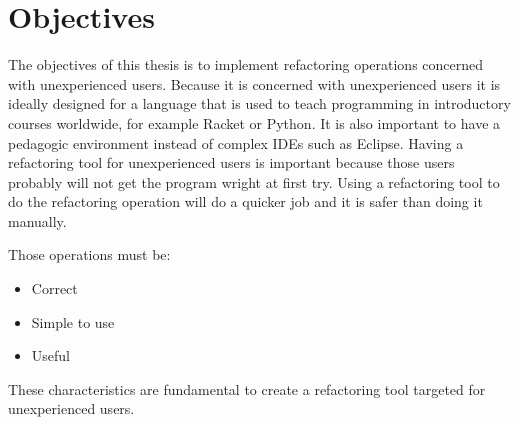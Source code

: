 
% 
% 

\section{Objectives}





The objectives of this thesis is to implement refactoring operations concerned with unexperienced users.
Because it is concerned with unexperienced users it is ideally designed for a language that is used to teach programming in introductory courses worldwide, for example Racket or Python.
It is also important to have a pedagogic environment instead of complex IDEs such as Eclipse.
Having a refactoring tool for unexperienced users is important because those users probably will not get the program wright at first try.
Using a refactoring tool to do the refactoring operation will do a quicker job and it is safer than doing it manually.

Those operations must be:
\begin{itemize}
\item Correct
\item Simple to use
\item Useful
\end{itemize}

These characteristics are fundamental to create a refactoring tool targeted for unexperienced users.